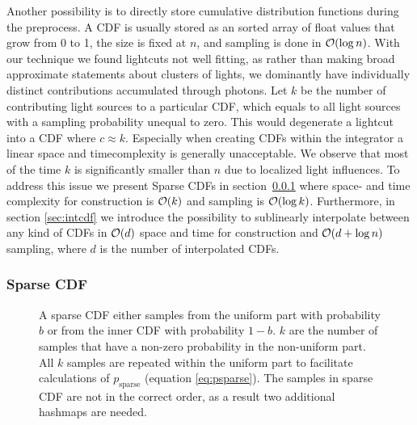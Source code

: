 Another possibility is to directly store cumulative distribution functions during the preprocess. A CDF is usually stored as an sorted array of float values that grow from 0 to 1, the size is fixed at $n$, and sampling is done in $\mathcal{O}(\log{n})$. With our technique we found lightcuts not well fitting, as rather than making broad approximate statements about clusters of lights, we dominantly have individually distinct contributions accumulated through photons. Let $k$ be the number of contributing light sources to a particular CDF, which equals to all light sources with a sampling probability unequal to zero. This would degenerate a lightcut into a CDF where $c \approx k$. Especially when creating CDFs within the integrator a linear space and timecomplexity is generally unacceptable. We observe that most of the time $k$ is significantly smaller than $n$ due to localized light influences. To address this issue we present Sparse CDFs in section~\ref{sec:sparse} where space- and time complexity for construction is $\mathcal{O}(k)$ and sampling is $\mathcal{O}(\log{k})$. Furthermore, in section \ref{sec:intcdf} we introduce the possibility to sublinearly interpolate between any kind of CDFs in $\mathcal{O}(d)$ space and time for construction and $\mathcal{O}(d + \log{n})$ sampling, where $d$ is the number of interpolated CDFs.

\subsubsection{Sparse CDF}
\label{sec:sparse}
\begin{figure}[htb] 
	\centering
    
    \caption{A sparse CDF either samples from the uniform part with probability $b$ or from the inner CDF with probability $1-b$. $k$ are the number of samples that have a non-zero probability in the non-uniform part. All $k$ samples are repeated within the uniform part to facilitate calculations of $p_{\text{sparse}}$ (equation \ref{eq:psparse}). The samples in sparse CDF are not in the correct order, as a result two additional hashmaps are needed.} 
    \label{fig:sparseCDF}
\end{figure}

